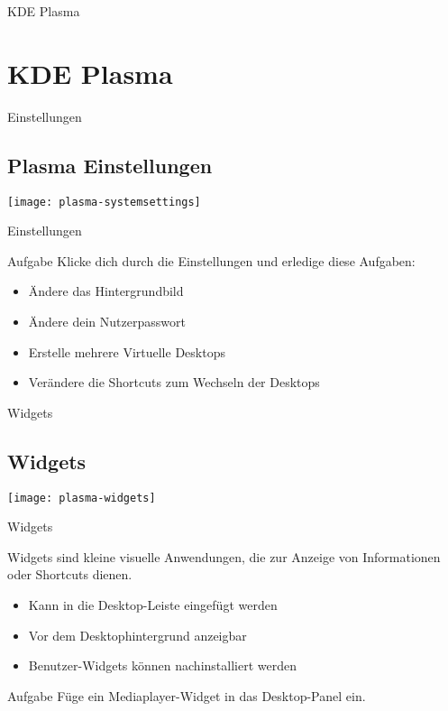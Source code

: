 
\begin{frame}{KDE Plasma}
    \section{KDE Plasma}\label{sec:KDE-Plasma}
\end{frame}

\begin{frame}{Einstellungen}
    \subsection{Plasma Einstellungen}\label{subsec:plasma-einstellungen}
    \texttt{[image: plasma-systemsettings]}
\end{frame}

\begin{frame}{Einstellungen}

    \vspace{0.5cm}
    \begin{alertblock}{Aufgabe}
        Klicke dich durch die Einstellungen und erledige diese Aufgaben:
        \begin{itemize}
            \item Ändere das Hintergrundbild
            \item Ändere dein Nutzerpasswort
            \item Erstelle mehrere Virtuelle Desktops
            \item Verändere die Shortcuts zum Wechseln der Desktops
        \end{itemize}
    \end{alertblock}
\end{frame}

\begin{frame}{Widgets}
    \subsection{Widgets}\label{subsec:widgets}
    \texttt{[image: plasma-widgets]}
\end{frame}

\begin{frame}{Widgets}

    Widgets sind kleine visuelle Anwendungen, die zur Anzeige von Informationen oder Shortcuts
    dienen.

    \begin{itemize}
        \item Kann in die Desktop-Leiste eingefügt werden
        \item Vor dem Desktophintergrund anzeigbar
        \item Benutzer-Widgets können nachinstalliert werden
    \end{itemize}

    \vspace{0.5cm}
    \begin{alertblock}{Aufgabe}
        Füge ein Mediaplayer-Widget in das Desktop-Panel ein.
    \end{alertblock}
\end{frame}

